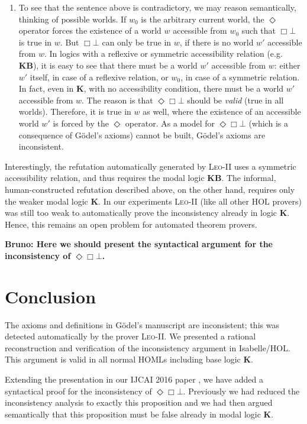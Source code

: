 \documentclass{llncs}
\newcommand{\logic}[1]{\textbf{#1}\xspace}
\newcommand{\KB}{\logic{KB}}
\newcommand{\K}{\logic{K}}
\newcommand{\Dia}{\Diamond} %
\newcommand{\nec}{\Box}
\newcommand{\pos}{\Dia}
\begin{document}
\begin{enumerate}
\item To see that the sentence above is contradictory, we may reason semantically, thinking of possible worlds. If $w_0$ is the arbitrary current world, the $\pos$ operator forces the existence of a world $w$ accessible from $w_0$ such that $\nec \bot$ is true in $w$. But $\nec \bot$ can only be true in $w$, if there is no world $w'$ accessible from $w$. In logics with a reflexive or symmetric accessibility relation (e.g. \KB), it is easy to see that there must be a world $w'$ accessible from $w$: either $w'$ itself, in case of a reflexive relation, or $w_0$, in case of a symmetric relation. In fact, even in \K, with no accessibility condition, there must be a world $w'$ accessible from $w$. The reason is that $\pos \nec \bot$ should be \emph{valid} (true in all worlds). Therefore, it is true in $w$ as well, where the existence of an accessible world $w'$ is forced by the $\pos$ operator. As a model for $\pos \nec \bot$ (which is a consequence of G\"odel's axioms) cannot be built, G\"odel's axioms are inconsistent.
\end{enumerate}

Interestingly, the refutation automatically generated by
\textsc{Leo-II} uses a symmetric accessibility relation, and thus
requires the modal logic \KB. The informal, human-constructed
refutation described above, on the other hand, requires only the
weaker modal logic \K. In our experiments \textsc{Leo-II} (like all
other HOL provers) was still too weak to automatically prove the
inconsistency already in logic \K. Hence, this remains an open problem for automated
theorem provers.



\textbf{Bruno: Here we should present the syntactical argument for the
  inconsistency of $\pos \nec \bot $.}


\section{Conclusion}\label{sec:conclusion}

The axioms and definitions in G\"odel's manuscript are inconsistent;
this was detected automatically by the prover
\textsc{Leo-II}. We presented a rational reconstruction and
verification of the inconsistency argument in Isabelle/HOL. This
argument is valid in all normal HOMLs including base logic \K.

Extending the presentation in our IJCAI 2016 paper \cite{C55}, we have added
a syntactical proof for the inconsistency of  $\pos \nec \bot$.  Previously we had reduced the inconsistency
analysis to exactly this proposition and we had then argued
semantically that this proposition must be false already in modal
logic \K. 
\end{document}
